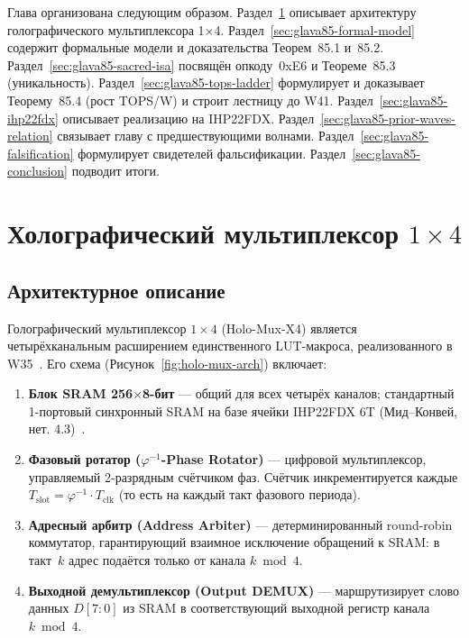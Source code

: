 Глава организована следующим образом.
Раздел~\ref{sec:glava85-holographic-mux} описывает архитектуру
голографического мультиплексора 1×4.
Раздел~\ref{sec:glava85-formal-model} содержит формальные модели и
доказательства Теорем~85.1 и~85.2.
Раздел~\ref{sec:glava85-sacred-isa} посвящён опкоду~0xE6 и
Теореме~85.3 (уникальность).
Раздел~\ref{sec:glava85-tops-ladder} формулирует и доказывает
Теорему~85.4 (рост TOPS/W) и строит лестницу до W41.
Раздел~\ref{sec:glava85-ihp22fdx} описывает реализацию на IHP22FDX.
Раздел~\ref{sec:glava85-prior-waves-relation} связывает главу с
предшествующими волнами.
Раздел~\ref{sec:glava85-falsification} формулирует свидетелей фальсификации.
Раздел~\ref{sec:glava85-conclusion} подводит итоги.

\section{Холографический мультиплексор $1\times 4$}
\label{sec:glava85-holographic-mux}

\subsection{Архитектурное описание}
\label{subsec:glava85-arch}

Голографический мультиплексор $1\times 4$ (Holo-Mux-X4) является
четырёхканальным расширением единственного LUT-макроса,
реализованного в W35~\cite{trios882}.
Его схема (Рисунок~\ref{fig:holo-mux-arch}) включает:

\begin{enumerate}
  \item \textbf{Блок SRAM 256$\times$8-бит} — общий для всех четырёх каналов;
        стандартный 1-портовый синхронный SRAM на базе ячейки IHP22FDX
        6T (Мид--Конвей, нет. 4.3)~\cite{Mead-Conway-VLSI}.

  \item \textbf{Фазовый ротатор ($\varphi^{-1}$-Phase Rotator)} — цифровой
        мультиплексор, управляемый 2-разрядным счётчиком фаз.
        Счётчик инкрементируется каждые $T_{\mathrm{slot}} = \varphi^{-1}
        \cdot T_{\mathrm{clk}}$ (то есть на каждый такт фазового периода).

  \item \textbf{Адресный арбитр (Address Arbiter)} — детерминированный
        round-robin коммутатор, гарантирующий взаимное исключение обращений
        к SRAM: в такт~$k$ адрес подаётся только от канала
        $k \bmod 4$.

  \item \textbf{Выходной демультиплексор (Output DEMUX)} —
        маршрутизирует слово данных $D[7:0]$ из SRAM в соответствующий
        выходной регистр канала~$k \bmod 4$.
\end{enumerate}

